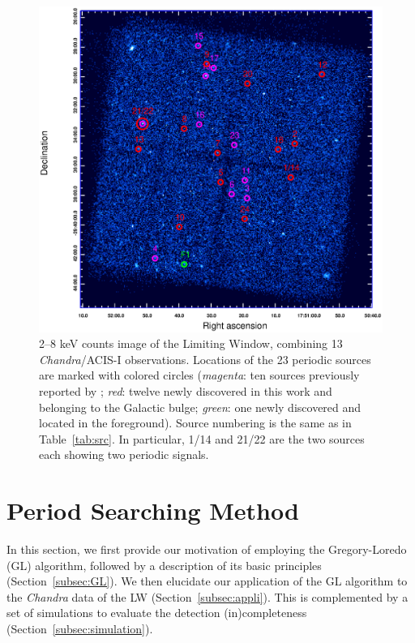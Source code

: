 \documentclass[twoside,twocolumn]{aastex63}
\begin{document}
\begin{figure}[htbp]
\centering
\includegraphics[scale=0.8]{./figure/LW/ds9.eps}
\caption{2--8 keV counts image of the Limiting Window, combining 13 {\it Chandra}/ACIS-I observations. Locations of the 23 periodic sources are marked with colored circles ({\it magenta}: ten sources previously reported by \cite{2012ApJ...746..165H}; {\it red}: twelve newly discovered in this work and belonging to the Galactic bulge; {\it green}: one newly discovered and located in the foreground). Source numbering is the same as in Table~\ref{tab:src}. In particular, 1/14 and 21/22 are the two sources each showing two periodic signals.}
\label{fig:FoV}
\end{figure}

\section{Period Searching Method}\label{sec:methods}
In this section, we first provide our motivation of employing the Gregory-Loredo (GL) algorithm, followed by a description of its basic principles (Section~\ref{subsec:GL}). We then elucidate our application of the GL algorithm to the {\it Chandra} data of the LW (Section~\ref{subsec:appli}). This is complemented by a set of simulations to evaluate the detection (in)completeness (Section~\ref{subsec:simulation}).  
\end{document}
